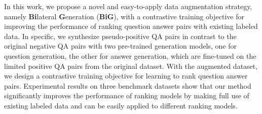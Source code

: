 In this work, we propose a novel and easy-to-apply data augmentation strategy, namely \textbf{Bi}lateral \textbf{G}eneration (\textbf{BiG}), with a contrastive training objective for improving the performance of ranking question answer pairs with existing labeled data. In specific, we synthesize pseudo-positive QA pairs in contrast to the original negative QA pairs with two pre-trained generation models, one for question generation, the other for answer generation, which are fine-tuned on the limited positive QA pairs from the original dataset. With the augmented dataset, we design a contrastive training objective for learning to rank question answer pairs. Experimental results on three benchmark datasets show that our method significantly improves the performance of ranking models by making full use of existing labeled data and can be easily applied to  different ranking models.
